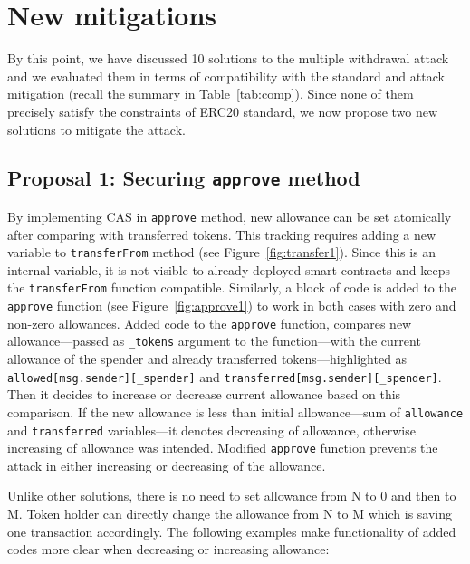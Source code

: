 
\section{New mitigations}

By this point, we have discussed 10 solutions to the multiple withdrawal attack and we evaluated them in terms of compatibility with the standard and attack mitigation (recall the summary in Table~\ref{tab:comp}). Since none of them precisely satisfy the constraints of ERC20 standard, we now propose two new solutions to mitigate the attack.

\subsection{Proposal 1: Securing \texttt{approve} method}

By implementing CAS \cite{Ref06} in \texttt{approve} method, new allowance can be set atomically after comparing with transferred tokens. This tracking requires adding a new variable to \texttt{transferFrom} method (see Figure~\ref{fig:transfer1}). Since this is an internal variable, it is not visible to already deployed smart contracts and keeps the \texttt{transferFrom} function compatible. Similarly, a block of code is added to the \texttt{approve} function (see Figure~\ref{fig:approve1}) to work in both cases with zero and non-zero allowances. Added code to the \texttt{approve} function, compares new allowance---passed as \texttt{\_tokens} argument to the function---with the current allowance of the spender and already transferred tokens---highlighted as \texttt{allowed[msg.sender][\_spender]} and \texttt{transferred[msg.sender][\_spender]}. Then it decides to increase or decrease current allowance based on this comparison. If the new allowance is less than initial allowance---sum of \texttt{allowance} and \texttt{transferred} variables---it denotes decreasing of allowance, otherwise increasing of allowance was intended. Modified \texttt{approve} function prevents the attack in either increasing or decreasing of the allowance.

Unlike other solutions, there is no need to set allowance from N to 0 and then to M. Token holder can directly change the allowance from N to M which is saving one transaction accordingly. The following examples make functionality of added codes more clear when decreasing or increasing allowance:
 
